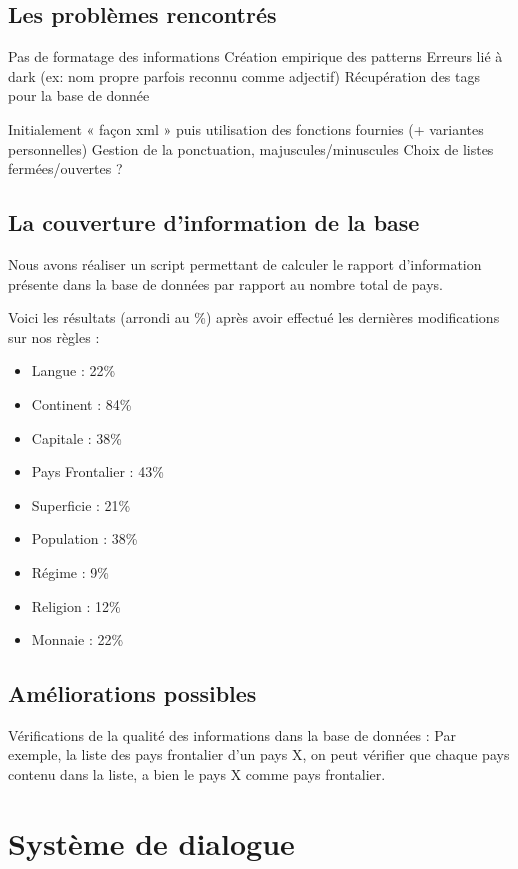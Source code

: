 \documentclass[11pt,a4paper]{article}
\begin{document}
\subsection{Les problèmes rencontrés}
Pas de formatage des informations
Création empirique des patterns
Erreurs lié à dark (ex: nom propre parfois reconnu comme adjectif)
Récupération des tags pour la base de donnée

Initialement « façon xml » puis utilisation des fonctions fournies (+ variantes
personnelles)
Gestion de la ponctuation, majuscules/minuscules
Choix de listes fermées/ouvertes ?

\subsection{La couverture d'information de la base}
Nous avons réaliser un script permettant de calculer le rapport d'information présente dans la base de données par rapport au nombre total de pays.

Voici les résultats (arrondi au \%) après avoir effectué les dernières modifications sur nos règles :
\begin{itemize}
	\item Langue 		  : 22\%
	\item Continent 	  : 84\%
	\item Capitale 		  : 38\%
	\item Pays Frontalier : 43\%
	\item Superficie	  : 21\%
	\item Population 	  : 38\%
	\item Régime 		  : 9\%
	\item Religion		  : 12\%
	\item Monnaie		  : 22\%
\end{itemize}

  


\subsection{Améliorations possibles}
Vérifications de la qualité des informations dans la base de données :
Par exemple, la liste des pays frontalier d'un pays X, on peut vérifier que chaque pays contenu dans la liste, a bien le pays X comme pays frontalier.

\clearpage

\section{Système de dialogue}
\end{document}
